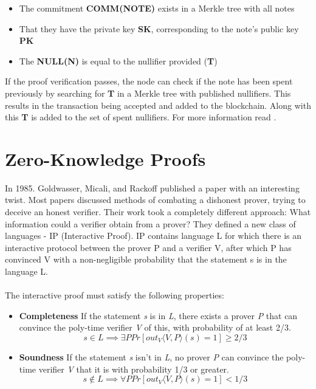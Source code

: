 \begin{itemize}
    \item The commitment \textbf{COMM(NOTE)} exists in a Merkle tree with all notes
    \item That they have the private key \textbf{SK}, corresponding to the note's public key \textbf{PK}
    \item The \textbf{NULL(N)} is equal to the nullifier provided (\textbf{T})
\end{itemize}

If the proof verification passes, the node can check if the note has been spent previously by searching for \textbf{T} in a Merkle tree with published nullifiers. This results in the transaction being accepted and added to the blockchain. Along with this \textbf{T} is added to the set of spent nullifiers. For more information read \cite{zcashzksnarks, zcashprotocol}.


\section{Zero-Knowledge Proofs}

In 1985. Goldwasser, Micali, and Rackoff published a paper with an interesting twist.\cite{goldwasser1985knowledge} Most papers discussed methods of combating a dishonest prover, trying to deceive an honest verifier. Their work took a completely different approach: What information could a verifier obtain from a prover? They defined a new class of languages - IP (Interactive Proof). IP contains language L for which there is an interactive protocol between the prover P and a verifier V, after which P has convinced V with a non-negligible probability that the statement s is in the language L.\\
\\
The interactive proof must satisfy the following properties:
\begin{itemize}
    \item \textbf{Completeness} If the statement \textit{s} is in \textit{L}, there exists a prover \textit{P} that can convince the poly-time verifier \textit{V} of this, with probability of at least 2/3.
    $$ s \in L \implies \exists P Pr[out_V \langle V, P \rangle (s) = 1 ] \geq 2/3 $$
    \item \textbf{Soundness} If the statement \textit{s} isn't in \textit{L}, no prover \textit{P} can convince the poly-time verifier \textit{V} that it is with probability 1/3 or greater.
    $$ s \notin L \implies \forall P Pr[out_V \langle V, P \rangle (s) = 1 ] < 1/3 $$
\end{itemize}

